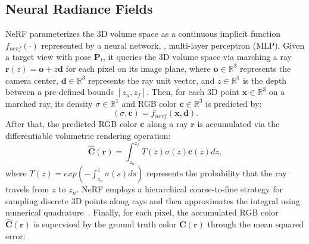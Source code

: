 \subsection{\textbf{Neural Radiance Fields}}
\label{sec:nerf}
NeRF parameterizes the 3D volume space as a continuous implicit function $f_{nerf}(\cdot)$ represented by a neural network, \eg, multi-layer perceptron (MLP). Given a target view with pose $\textbf{P}_t$, it queries the 3D volume space via marching a ray $\textbf{r}(z) = \textbf{o} + z \textbf{d}$ for each pixel on its image plane, where $\textbf{o} \in  \mathbb{R}^3$ represents the camera center, $\textbf{d} \in  \mathbb{R}^3 $ represents the ray unit vector, and $z \in  \mathbb{R}^1$ is the depth between a pre-defined bounds $[z_n, z_f]$. Then, for each 3D point $\textbf{x} \in  \mathbb{R}^3 $ on a marched ray, its density $\sigma \in  \mathbb{R}^1$ and RGB color $\textbf{c} \in  \mathbb{R}^3$ is predicted by:
\begin{equation}
    (\sigma, \textbf{c}) = f_{nerf }(\textbf{x}, \textbf{d}).
\end{equation}
After that, the predicted RGB color $\textbf{c}$ along a ray $\textbf{r}$ is accumulated via the differentiable volumetric rendering operation: 
\begin{equation}
    \label{accumulate}
    \hat{\textbf{C}}(\textbf{r}) = \int_{z_n}^{z_f} T(z) \sigma (z) \textbf{c}(z) dz,
\end{equation}
where $T(z) = exp (- \int_{z_n}^z \sigma(s) ds )$ represents the probability that the ray travels from $z$ to $z_n$. 
NeRF employs a hierarchical coarse-to-fine strategy for sampling discrete 3D points along rays and then approximates the integral using numerical quadrature~\cite{max1995optical}. 
Finally, for each pixel, the accumulated RGB color $\hat{\textbf{C}}(\textbf{r})$ is supervised by the ground truth color $\textbf{C}(\textbf{r})$ through the mean squared error:
 
